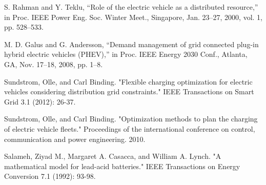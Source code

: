 S. Rahman and Y. Teklu, “Role of the electric vehicle as a distributed
resource,” in Proc. IEEE Power Eng. Soc. Winter Meet., Singapore,
Jan. 23–27, 2000, vol. 1, pp. 528–533.

 M. D. Galus and G. Andersson, “Demand management of grid connected
plug-in hybrid electric vehicles (PHEV),” in Proc. IEEE Energy
2030 Conf., Atlanta, GA, Nov. 17–18, 2008, pp. 1–8.

Sundstrom, Olle, and Carl Binding. "Flexible charging optimization for electric vehicles considering distribution grid constraints." IEEE Transactions on Smart Grid 3.1 (2012): 26-37.

Sundstrom, Olle, and Carl Binding. "Optimization methods to plan the charging of electric vehicle fleets." Proceedings of the international conference on control, communication and power engineering. 2010.

Salameh, Ziyad M., Margaret A. Casacca, and William A. Lynch. "A mathematical model for lead-acid batteries." IEEE Transactions on Energy Conversion 7.1 (1992): 93-98.


